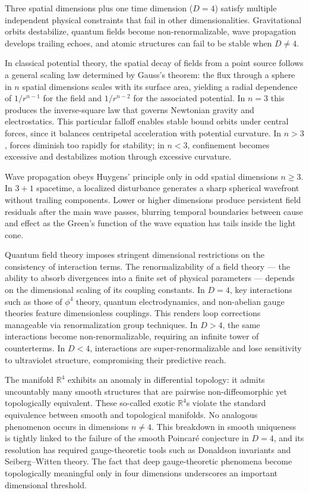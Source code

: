 Three spatial dimensions plus one time dimension ($D=4$) satisfy multiple independent physical constraints that fail in other dimensionalities. Gravitational orbits destabilize, quantum fields become non-renormalizable, wave propagation develops trailing echoes, and atomic structures can fail to be stable when $D \ne 4$.

In classical potential theory, the spatial decay of fields from a point source follows a general scaling law determined by Gauss’s theorem: the flux through a sphere in $n$ spatial dimensions scales with its surface area, yielding a radial dependence of $1/r^{n-1}$ for the field and $1/r^{n-2}$ for the associated potential. In $n=3$ this produces the inverse-square law that governs Newtonian gravity and electrostatics. This particular falloff enables stable bound orbits under central forces, since it balances centripetal acceleration with potential curvature. In $n>3$, forces diminish too rapidly for stability; in $n<3$, confinement becomes excessive and destabilizes motion through excessive curvature.

Wave propagation obeys Huygens' principle only in odd spatial dimensions $n\ge 3$. In $3+1$ spacetime, a localized disturbance generates a sharp spherical wavefront without trailing components. Lower or higher dimensions produce persistent field residuals after the main wave passes, blurring temporal boundaries between cause and effect as the Green’s function of the wave equation has tails inside the light cone.

Quantum field theory imposes stringent dimensional restrictions on the consistency of interaction terms. The renormalizability of a field theory — the ability to absorb divergences into a finite set of physical parameters — depends on the dimensional scaling of its coupling constants. In $D=4$, key interactions such as those of $\phi^4$ theory, quantum electrodynamics, and non-abelian gauge theories feature dimensionless couplings. This renders loop corrections manageable via renormalization group techniques. In $D>4$, the same interactions become non-renormalizable, requiring an infinite tower of counterterms. In $D<4$, interactions are super-renormalizable and lose sensitivity to ultraviolet structure, compromising their predictive reach.

The manifold $\mathbb{R}^4$ exhibits an anomaly in differential topology: it admits uncountably many smooth structures that are pairwise non-diffeomorphic yet topologically equivalent. These so-called exotic $\mathbb{R}^4$s violate the standard equivalence between smooth and topological manifolds. No analogous phenomenon occurs in dimensions $n \ne 4$. This breakdown in smooth uniqueness is tightly linked to the failure of the smooth Poincaré conjecture in $D=4$, and its resolution has required gauge-theoretic tools such as Donaldson invariants and Seiberg–Witten theory. The fact that deep gauge-theoretic phenomena become topologically meaningful only in four dimensions underscores an important dimensional threshold.

